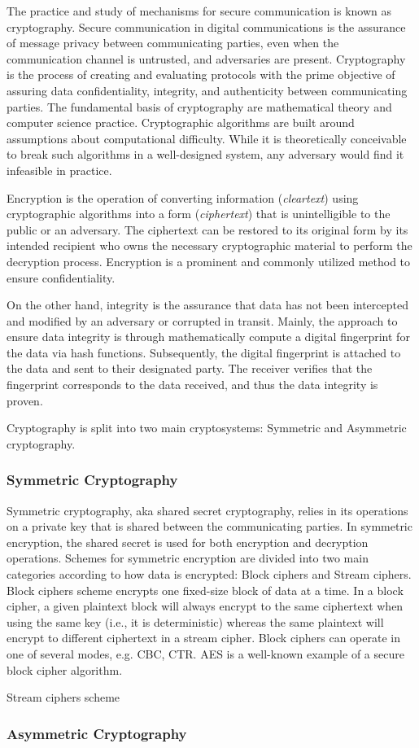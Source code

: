 The practice and study of mechanisms for secure communication is known as cryptography. Secure communication in digital communications is the assurance of message privacy between communicating parties, even when the communication channel is untrusted, and adversaries are present. Cryptography is the process of creating and evaluating protocols with the prime objective of assuring data confidentiality, integrity, and authenticity between communicating parties. The fundamental basis of cryptography are mathematical theory and computer science practice. Cryptographic algorithms are built around assumptions about computational difficulty. While it is theoretically conceivable to break such algorithms in a well-designed system, any adversary would find it infeasible in practice.
\par
Encryption is the operation of converting information (\textit{cleartext}) using cryptographic algorithms into a form (\textit{ciphertext}) that is unintelligible to the public or an adversary. The ciphertext can be restored to its original form by its intended recipient who owns the necessary cryptographic material to perform the decryption process. Encryption is a prominent and commonly utilized method to ensure confidentiality.
\par
On the other hand, integrity is the assurance that data has not been intercepted and modified by an adversary or corrupted in transit. Mainly, the approach to ensure data integrity is through mathematically compute a digital fingerprint for the data via hash functions. Subsequently, the digital fingerprint is attached to the data and sent to their designated party. The receiver verifies that the fingerprint corresponds to the data received, and thus the data integrity is proven.
\par
Cryptography is split into two main cryptosystems: Symmetric and Asymmetric cryptography.

\subsubsection{Symmetric Cryptography}
Symmetric cryptography, aka shared secret cryptography, relies in its operations on a private key that is shared between the communicating parties. In symmetric encryption, the shared secret is used for both encryption and decryption operations. Schemes for symmetric encryption are divided into two main categories according to how data is encrypted: Block ciphers and Stream ciphers.
Block ciphers scheme encrypts one fixed-size block of data at a time. In a block cipher, a given plaintext block will always encrypt to the same ciphertext when using the same key (i.e., it is deterministic) whereas the same plaintext will encrypt to different ciphertext in a stream cipher. Block ciphers can operate in one of several modes, e.g. CBC, CTR. AES is a well-known example of a secure block cipher algorithm.
\par
Stream ciphers scheme 
\subsubsection{Asymmetric Cryptography}